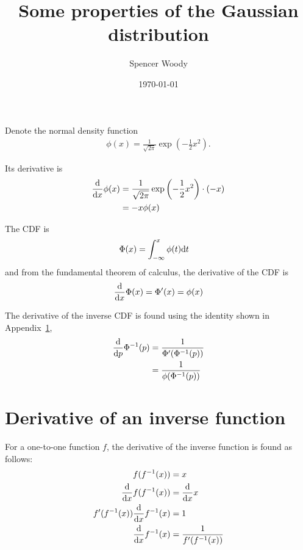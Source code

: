 \documentclass[letter]{article}
\title{Some properties of the Gaussian distribution}
\author{Spencer Woody}
\date{\today}
\begin{document}
\maketitle


Denote the normal density function
\begin{align*}
  \phi(x) = \frac{1}{\sqrt{2\pi}} \exp \left( - \frac{1}{2} x^2 \right). 
\end{align*}

Its derivative is
\begin{align*}
  \frac{\mathrm{d}}{\mathrm{d} x} \phi(x) &=
  \frac{1}{\sqrt{2\pi}} \exp \left( - \frac{1}{2} x^2 \right) \cdot
  (-x) \\
  &= -x  \phi(x)
\end{align*}

The CDF is
\begin{align*}
  \Phi(x) &= \int_{-\infty}^{x} \phi(t) \mathrm{d} t
\end{align*}
and from the fundamental theorem of calculus, the derivative of the CDF is
\begin{align*}
  \frac{\mathrm{d}}{\mathrm{d} x} \Phi(x) = \Phi'(x) = \phi(x)
\end{align*}

The derivative of the inverse CDF is found using the identity shown in Appendix~\ref{sec:deriv-inverse-funct},
\begin{align*}
  \frac{\mathrm{d}}{\mathrm{d} p}\Phi^{-1}(p) &= \frac{1}{\Phi'(\Phi^{-1}(p))} \\
                                  &= \frac{1}{\phi(\Phi^{-1}(p))}
\end{align*}



\appendix

\section{Derivative of an inverse function}
\label{sec:deriv-inverse-funct}

For a one-to-one function $f$, the derivative of the inverse function
is found as follows:
\begin{align*}
  f(f^{-1}(x)) &= x \\
   \frac{\mathrm{d}}{\mathrm{d} x} f(f^{-1}(x)) &= \frac{\mathrm{d}}{\mathrm{d} x} x  \\
   f'(f^{-1}(x)) \frac{\mathrm{d}}{\mathrm{d} x} f^{-1}(x) &= 1 \\
  \frac{\mathrm{d}}{\mathrm{d} x} f^{-1}(x) &= \frac{1}{f'(f^{-1}(x))}
\end{align*}



\end{document}
